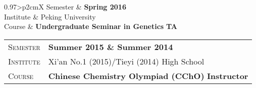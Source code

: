 \documentclass[a4paper, oneside, final]{scrartcl} %
\begin{document}
\begin{center}
\begin{tabularx}{0.97\linewidth}{>{\raggedleft\scshape}p{2cm}X}
	Semester & \textbf{Spring 2016}\\
	Institute & Peking University\\
	Course & \textbf{Undergraduate Seminar in Genetics} \hfill \textbf{TA}\\
\end{tabularx}
\vspace{12pt}


\begin{tabularx}{0.97\linewidth}{>{\raggedleft\scshape}p{2cm}X}
	Semester & \textbf{Summer 2015 \& Summer 2014}\\
	Institute & Xi'an No.1 (2015)/Tieyi (2014) High School\\
	Course & \textbf{Chinese Chemistry Olympiad (CChO)} \hfill \textbf{Instructor}\\
\end{tabularx}
\vspace{12pt}



\end{center}
\end{document}
